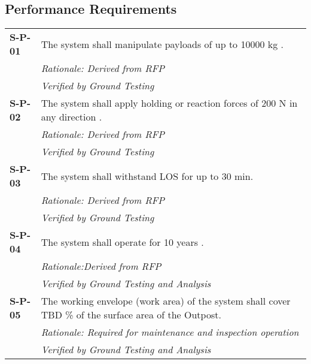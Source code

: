 \subsection{Performance Requirements}
\vspace{-15pt}
\begin{longtable}{P{1.5cm}P{14.25cm}}
\textbf{S-P-01}	& The system shall manipulate payloads of up to 10000 \gls{kg} \cite{RFP}. \\
& \textit{Rationale: Derived from \gls{RFP}}	\\
& \textit{Verified by Ground Testing}	\\
\textbf{S-P-02}	& The system shall apply holding or reaction forces of 200 \gls{N} in any direction \cite{RFP}. \\
& \textit{Rationale: Derived from \gls{RFP}}	\\
& \textit{Verified by Ground Testing}	\\
\textbf{S-P-03}	& The system shall withstand LOS for up to 30 \gls{min}.\\ & \textit{Rationale: Derived from \gls{RFP}}	\\
& \textit{Verified by Ground Testing}	\\
\textbf{S-P-04}	& The system shall operate for 10 years  \cite{RFP}. \\
& \textit{Rationale:Derived from \gls{RFP}}	\\
& \textit{Verified by Ground Testing and Analysis}	\\
\textbf{S-P-05}	& The working envelope (work area) of the system shall cover TBD \% of the surface area of the Outpost. \\
& \textit{Rationale: Required for maintenance and inspection operation}	\\
& \textit{Verified by Ground Testing and Analysis}	\\
\end{longtable}
